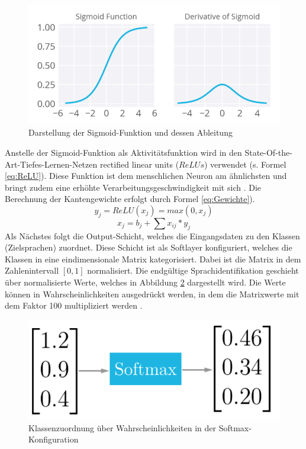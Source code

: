 \begin{figure}[h!]
	\centering
	\includegraphics[width=1.0\linewidth]{images/sigmund}
	\caption{Darstellung der Sigmoid-Funktion und dessen Ableitung \cite{Kulbear.2017}} %
	\label{fig:features11.0}
\end{figure}
Anstelle der Sigmoid-Funktion als Aktivitätsfunktion wird in den State-Of-the-Art-Tiefes-Lernen-Netzen rectified linear units ($ReLUs$) verwendet (s. Formel \ref{eq:ReLU}). Diese Funktion ist dem menschlichen Neuron am ähnlichsten und bringt zudem eine erhöhte Verarbeitungsgeschwindigkeit mit sich \cite{zeiler.2013}. Die Berechnung der Kantengewichte erfolgt durch Formel \ref{eq:Gewichte}).
\begin{equation}
y_{j} = ReLU(x_{j}) = max(0,x_{j}) 
\label{eq:ReLU}
\end{equation}
\begin{equation}
x_{ j } = b_{ j } + \sum{ }{ }{ x_{ ij } * y_{j}}
\label{eq:Gewichte}
\end{equation}
Als Nächstes folgt die Output-Schicht, welches die Eingangsdaten zu den Klassen (Zielsprachen) zuordnet. Diese Schicht ist als Softlayer konfiguriert, welches die Klassen in eine eindimensionale Matrix kategorisiert. Dabei ist die Matrix in dem Zahlenintervall $[0,1]$ normalisiert. Die endgültige Sprachidentifikation geschieht über normalisierte Werte, welches in Abbildung \ref{fig:soft} dargestellt wird. Die Werte können in Wahrscheinlichkeiten ausgedrückt werden, in dem die Matrixwerte mit dem Faktor 100 multipliziert werden \cite{Kulbear.2017}.
\begin{figure}[h!]
	\centering
	\includegraphics[width=0.7\linewidth]{images/softmax}
	\caption{Klassenzuordnung über Wahrscheinlichkeiten in der Softmax-Konfiguration \cite{Kulbear.2017}} %
	\label{fig:soft}
\end{figure}
